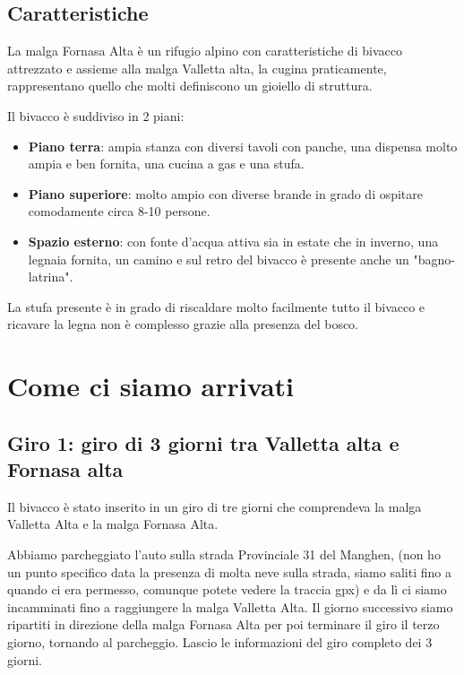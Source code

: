 \documentclass{article}
\begin{document}
\subsection{Caratteristiche}
La malga Fornasa Alta è un rifugio alpino con caratteristiche di bivacco attrezzato e assieme alla malga Valletta alta, la cugina praticamente, rappresentano quello che molti definiscono un gioiello di struttura.

Il bivacco è suddiviso in 2 piani:
\begin{itemize}
    \item \textbf{Piano terra}: ampia stanza con diversi tavoli con panche, una dispensa molto ampia e ben fornita, una cucina a gas e una stufa.
    \item \textbf{Piano superiore}: molto ampio con diverse brande in grado di ospitare comodamente circa 8-10 persone. 
    \item \textbf{Spazio esterno}: con fonte d'acqua attiva sia in estate che in inverno, una legnaia fornita, un camino e sul retro del bivacco è presente anche un "bagno-latrina".
\end{itemize}

La stufa presente è in grado di riscaldare molto facilmente tutto il bivacco e ricavare la legna non è complesso grazie alla presenza del bosco. 


\section{Come ci siamo arrivati}
\subsection{Giro 1: giro di 3 giorni tra Valletta alta e Fornasa alta}
Il bivacco è stato inserito in un giro di tre giorni che comprendeva la malga Valletta Alta e la malga Fornasa Alta.

Abbiamo parcheggiato l’auto sulla strada Provinciale 31 del Manghen, (non ho un punto specifico data la presenza di molta neve sulla strada, siamo saliti fino a quando ci era permesso, comunque potete vedere la traccia gpx) e da lì ci siamo incamminati fino a raggiungere la malga Valletta Alta. Il giorno successivo siamo ripartiti in direzione della malga Fornasa Alta per poi terminare il giro il terzo giorno, tornando al parcheggio.
Lascio le informazioni del giro completo dei 3 giorni.
\end{document}
